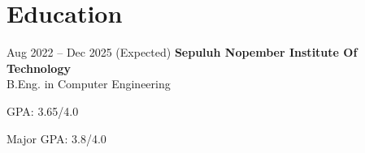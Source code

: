 \section{Education}

    \begin{twocolentry}{
        Aug 2022 – Dec 2025 (Expected)
    }
    \textbf{Sepuluh Nopember Institute Of Technology}\\
    B.Eng. in Computer Engineering\end{twocolentry}

    \vspace{0.10 cm}
    \begin{onecolentry}
        \begin{highlights}
            \item GPA: 3.65/4.0
            \item Major GPA: 3.8/4.0
        \end{highlights}
    \end{onecolentry}
